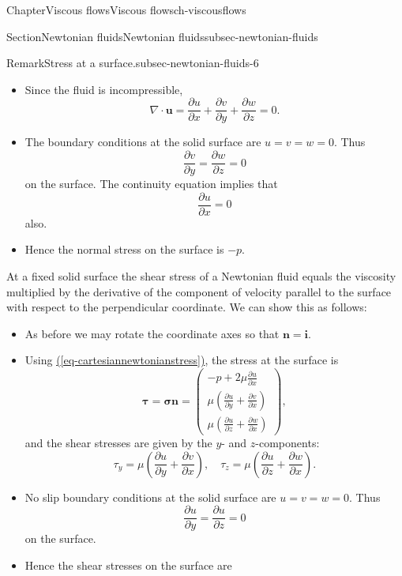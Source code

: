 \documentclass[oneside,10pt,]{book}
\newcommand{\xreffont}{\relax}
\numberwithin{equation}{section}
\newcommand{\pd}[2]{\frac{\partial#1}{\partial#2}}
\newcommand{\bn}{\boldsymbol{n}}
\newcommand{\bu}{\boldsymbol{u}}
\newcommand{\bsigma}{\boldsymbol{\sigma}}
\newcommand{\btau}{\boldsymbol{\tau}}
\newcommand{\bi}{\boldsymbol{i}}
\begin{document}
\begin{chapterptx}{Chapter}{Viscous flows}{}{Viscous flows}{}{}{ch-viscousflows}
\begin{sectionptx}{Section}{Newtonian fluids}{}{Newtonian fluids}{}{}{subsec-newtonian-fluids}
\begin{remark}{Remark}{Stress at a surface.}{subsec-newtonian-fluids-6}
\begin{itemize}[label=\textbullet]
\item{}Since the fluid is incompressible,%
\begin{equation*}
\nabla\cdot\bu=\pd{u}{x}+\pd{v}{y}+\pd{w}{z}=0.
\end{equation*}
%
\item{}The boundary conditions at the solid surface are \(u=v=w=0\). Thus%
\begin{equation*}
\pd{v}{y}=\pd{w}{z}=0
\end{equation*}
on the surface. The continuity equation implies that%
\begin{equation*}
\pd{u}{x}=0
\end{equation*}
also.%
\item{}Hence the normal stress on the surface is \(-p\).%
\end{itemize}
%
\par
At a fixed solid surface the shear stress of a Newtonian fluid equals the viscosity multiplied by the derivative of the component of velocity parallel to the surface with respect to the perpendicular coordinate. We can show this as follows:%
\begin{itemize}[label=\textbullet]
\item{}As before we may rotate the coordinate axes so that \(\bn=\bi\).%
\item{}Using \hyperref[eq-cartesiannewtonianstress]{({\xreffont\ref{eq-cartesiannewtonianstress}})}, the stress at the surface is%
\begin{equation*}
\btau=\bsigma\bn
=\left(\begin{matrix}
-p+2\mu\pd{u}{x}\\
\mu\left(\pd{u}{y}+\pd{v}{x}\right)\\
\mu\left(\pd{u}{z}+\pd{w}{x}\right)
\end{matrix}\right),
\end{equation*}
and the shear stresses are given by the \(y\)- and \(z\)-components:%
\begin{equation*}
\tau_y=\mu\left(\pd{u}{y}+\pd{v}{x}\right),\quad
\tau_z=\mu\left(\pd{u}{z}+\pd{w}{x}\right).
\end{equation*}
%
\item{}No slip boundary conditions at the solid surface are \(u=v=w=0\). Thus%
\begin{equation*}
\pd{u}{y}=\pd{u}{z}=0
\end{equation*}
on the surface.%
\item{}Hence the shear stresses on the surface are%
\begin{equation*}

\end{equation*}
\end{itemize}
\end{remark}
\end{sectionptx}
\end{chapterptx}
\end{document}
